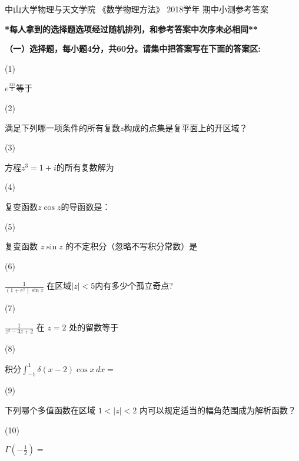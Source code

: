 \documentclass[CJK]{article}
\begin{document}
\bch
\bcenter
中山大学物理与天文学院 《数学物理方法》 2018学年 期中小测参考答案

{\vskip 0.04in}

{\bf **每人拿到的选择题选项经过随机排列，和参考答案中次序未必相同** }

\ecenter

{\vskip 0.02in}
    
{\bf \noindent（一）选择题，每小题4分，共60分。请集中把答案写在下面的答案区:}

\bitem
\item[(1)]{$e^{\frac{3\pi i}{2}}$等于 

}
\item[(2)]{满足下列哪一项条件的所有复数$z$构成的点集是复平面上的开区域？

}
\item[(3)]{方程$z^3=1+i$的所有复数解为 

}
\item[(4)]{复变函数$z\cos z$的导函数是：
  
  }
\item[(5)]{复变函数 $z\sin z$ 的不定积分（忽略不写积分常数）是 
  
  }
\item[(6)]{$\frac{1}{(1+e^z)\sin z}$ 在区域$|z|< 5 $内有多少个孤立奇点? 
  
  }
\item[(7)]{$\frac{1}{z^2-3z+2}$ 在 $z=2$ 处的留数等于 

    }  
\item[(8)]{积分$\int_{-1}^1 \delta(x-2) \cos x\, dx =$

    }  
\item[(9)]{下列哪个多值函数在区域 $1<|z|<2$ 内可以规定适当的幅角范围成为解析函数？ 

  }
\item[(10)]{$\Gamma(- \frac{1}{2}) = $ 

  }
\end{document}
